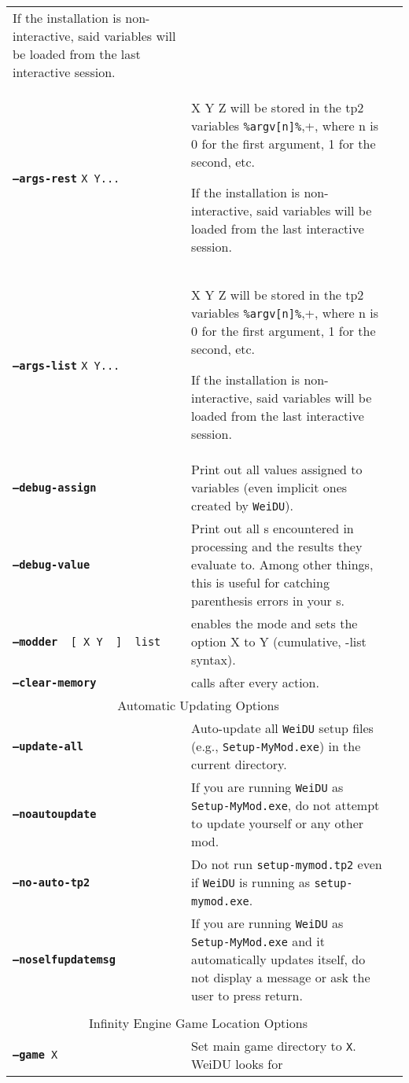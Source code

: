 \documentclass{article}
\def\ttref#1{\ahrefloc{#1}{\tt #1}}
\def\DEFINE#1{{\tt \bf #1}\label{#1}\index{#1}}
\def\t#1{{\tt #1}}
\def\Slist{{\color{red} list }}
\def\Ob{{\color{red} [ }}
\def\Oe{{\color{red} ] }}
\begin{document}
\begin{tabular}{lp{10in}|p{10in}}
If the installation is non-interactive, said variables will be loaded from the last interactive
session. \\
\DEFINE{--args-rest} \t{X Y...} & X Y Z will be stored in the tp2 variables \verb+%argv[n]%+,
where n is 0 for the first argument, 1 for the second, etc.

If the installation is non-interactive, said variables will be loaded from the last interactive
session. \\
\DEFINE{--args-list} \t{X Y...} & X Y Z will be stored in the tp2 variables \verb+%argv[n]%+,
where n is 0 for the first argument, 1 for the second, etc.

If the installation is non-interactive, said variables will be loaded from the last interactive
session. \\
\DEFINE{--debug-assign} & Print out all values assigned to \ttref{TP2}
variables (even implicit ones created by \t{WeiDU}). \\
\DEFINE{--debug-value} & Print out all \ttref{value}s encountered in
\ttref{TP2} processing and the results they evaluate to. Among other
things, this is useful for catching parenthesis errors in your
\ttref{value}s. \\
{\tt \DEFINE{--modder} \Ob X Y \Oe \Slist} & enables the
\ttref{MODDER} mode and sets the \ttref{MODDER} option X to Y (cumulative,
-list syntax).
\\
\DEFINE{--clear-memory} & calls \ttref{CLEAR!MEMORY} after every \ttref{TP2} action.
\\
\multicolumn{2}{c}{ \color{red} Automatic Updating Options } \\
\DEFINE{--update-all} & Auto-update all \t{WeiDU} setup files (e.g.,
\t{Setup-MyMod.exe}) in the current directory. \\
\DEFINE{--noautoupdate} & If you are running \t{WeiDU} as
\t{Setup-MyMod.exe}, do not attempt to update yourself or any other mod. \\
\DEFINE{--no-auto-tp2} & Do not run \t{setup-mymod.tp2} even if \t{WeiDU} is
running as \t{setup-mymod.exe}. \\
\DEFINE{--noselfupdatemsg} & If you are running \t{WeiDU} as
\t{Setup-MyMod.exe} and it automatically updates itself, do not display a
message or ask the user to press return. \\
\\
\multicolumn{2}{c}{ \color{red} Infinity Engine Game Location Options } \\
{\tt \DEFINE{--game} X	} & Set main game directory to {\tt X}. WeiDU looks for

\end{tabular}
\end{document}
